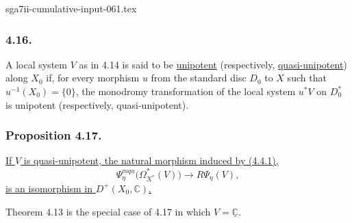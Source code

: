 \begin{filecontents*}{sga7ii-cumulative-input-061.tex}
\subsubsection*{4.16.}
A local system $V$ as in 4.14 is said to be \underline{unipotent}
(respectively, \underline{quasi-unipotent}) along $X_0$ if, for every
morphism $u$ from the standard disc $D_0$ to $X$ such that
$u^{-1}(X_0)=\{0\}$, the monodromy transformation of the local system
$u^*V$ on $D_0^*$ is unipotent (respectively, quasi-unipotent).

\subsubsection*{Proposition 4.17.}
\underline{If $V$ is quasi-unipotent, the natural morphism induced by
(4.4.1),}
\begin{equation}\tag{4.17.1}
\Psi_\eta^{mqu}\bigl(\Omega_{X^*}^*(V)\bigr)
\longrightarrow R\Psi_\eta(V),
\end{equation}
\underline{is an isomorphism in $D^+(X_0,\mathbb C)$.}

Theorem 4.13 is the special case of 4.17 in which
$V=\underline{\mathbb C}$.
\end{filecontents*}
